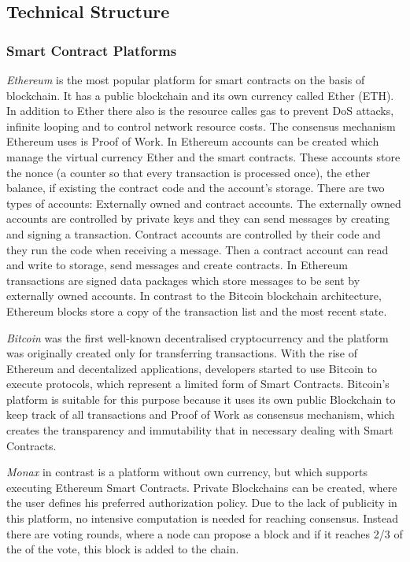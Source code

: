 \documentclass[conference]{IEEEtran}
\begin{document}
\subsection{Technical Structure}

\subsubsection{Smart Contract Platforms}
\textit{Ethereum} is the most popular platform for smart contracts on the basis of blockchain. \cite{Meitinger2017} It has a public blockchain and its own currency called Ether (ETH). In addition to Ether there also is the resource calles gas to prevent DoS attacks, infinite looping and to control network resource costs. The consensus mechanism Ethereum uses is Proof of Work. In Ethereum accounts can be created which manage the virtual currency Ether and the smart contracts. \cite{Bartoletti2017} \cite{Zhang2016} These accounts store the nonce (a counter so that every transaction is processed once), the ether balance, if existing the contract code and the account's storage. There are two types of accounts: Externally owned and contract accounts. The externally owned accounts are controlled by private keys and they can send messages by creating and signing a transaction. Contract accounts are controlled by their code and they run the code when receiving a message. Then a contract account can read and write to storage, send messages and create contracts. In Ethereum transactions are signed data packages which store messages to be sent by externally owned accounts. In contrast to the Bitcoin blockchain architecture, Ethereum blocks store a copy of the transaction list and the most recent state. \cite{Buterin2014}  \par
\textit{Bitcoin} was the first well-known decentralised cryptocurrency and the platform was originally created only for transferring transactions. With the rise of Ethereum and decentalized applications, developers started to use Bitcoin to execute protocols, which represent a limited form of Smart Contracts. Bitcoin's platform is suitable for this purpose because it uses its own public Blockchain to keep track of all transactions and Proof of Work as consensus mechanism, which creates the transparency and immutability that in necessary dealing with Smart Contracts. \cite{Bartoletti2017} \par 
\textit{Monax} in contrast is a platform without own currency, but which supports executing Ethereum Smart Contracts. Private Blockchains can be created, where the user defines his preferred authorization policy. Due to the lack of publicity in this platform, no intensive computation is needed for reaching consensus. Instead there are voting rounds, where a node can propose a block and if it reaches 2/3 of the of the vote, this block is added to the chain. \cite{Bartoletti2017} \par 
\end{document}
